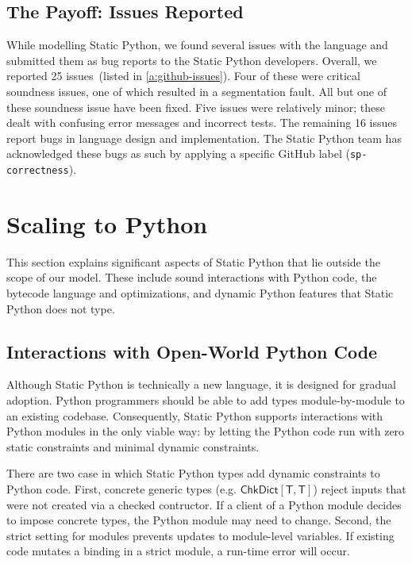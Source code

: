 \documentclass[english,cleveref,submission]{programming}
\newcommand{\SP}{Static Python}
\newcommand{\code}[1]{\texttt{#1}}
\newcommand{\typefont}[1]{\mathsf{#1}}
\newcommand{\paramtype}[2]{#1[#2]}
\newcommand{\sptype}{\typefont{T}}
\newcommand{\sptchkdict}[2]{\paramtype{\typefont{ChkDict}}{#1, #2}}
\begin{document}
\subsection{The Payoff: Issues Reported}

While modelling \SP{}, we found several issues with the language
and submitted them as bug reports to the \SP{} developers.
Overall, we reported 25 issues~(listed in \cref{a:github-issues}).
Four of these were critical soundness issues, one of which resulted in
a segmentation fault.
All but one of these soundness issue have been fixed.
Five issues were relatively minor; these dealt with confusing error messages
and incorrect tests.
The remaining 16 issues report bugs in language design and implementation.
The \SP{} team has acknowledged these bugs as such by applying a specific GitHub label (\code{sp-correctness}).




\section{Scaling to Python}
\label{s:impl}


This section explains significant aspects of \SP{} that lie outside the
scope of our model.
These include sound interactions with Python code,
the bytecode language and optimizations, and dynamic Python features
that \SP{} does not type.


\subsection{Interactions with Open-World Python Code}

Although \SP{} is technically a new language, it is designed for gradual adoption.
Python programmers should be able to add types module-by-module to an
existing codebase.
Consequently, \SP{} supports interactions with Python modules in the only viable
way: by letting the Python code run with zero static constraints and minimal
dynamic constraints.

There are two case in which \SP{} types add dynamic constraints to Python code.
First, concrete generic types (e.g. $\sptchkdict{\sptype}{\sptype}$)
reject inputs that were not created via a checked contructor.
If a client of a Python module decides to impose concrete types, the Python module
may need to change.
Second, the strict setting for modules prevents updates to module-level variables.
If existing code mutates a binding in a strict module, a run-time error will
occur.
\end{document}
